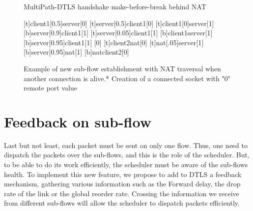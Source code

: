 \begin{figure}[!h]
\centering
\begin{msc}[r]{MultiPath-DTLS handshake make-before-break behind NAT}

\setlength{\instfootheight}{0em}
\setlength{\instheadheight}{0em}
\setlength{\instdist}{0.25\linewidth}
\setlength{\levelheight}{3em}


[t]{client1}[0.5]{server}[0]
\nextlevel
{}[t]{server}[0.5]{client1}[0]
\nextlevel
{}[t]{client1}[0]{server}[1]
\nextlevel
{}[b]{server}[0.9]{client1}[1]
\nextlevel[2]
[t]{server}[0.05]{client1}[1]
\nextlevel
{}
[b]{client1}{server}[1]
\nextlevel
{}[b]{server}[0.95]{client1}[1]
\nextlevel
{}
[0]
\nextlevel
{}[t]{client2}{nat}[0]
[t]{nat}[.05]{server}[1]
\nextlevel
{}[b]{server}[0.95]{nat}[1]
\nextlevel
{}[b]{nat}{client2}[0]
\nextlevel[2]
\end{msc}
\caption{Example of new sub-flow establishment with NAT traversal when another connection is alive.\newline{}* Creation of a connected socket with "0" remote port value }
\label{fig:HandshakeNAT}
\end{figure}

\newpage
\section{Feedback on sub-flow}

Last but not least, each packet must be sent on only one flow. Thus, one need to dispatch the packets over the sub-flows, and this is the role of the scheduler. But, to be able to do its work efficiently, the scheduler must be aware of the sub-flows health. To implement this new feature, we propose to add to DTLS a feedback mechanism, gathering various information such as the Forward delay, the drop rate of the link or the global reorder rate. Crossing the information we receive from different sub-flows will allow the scheduler to dispatch packets efficiently.

